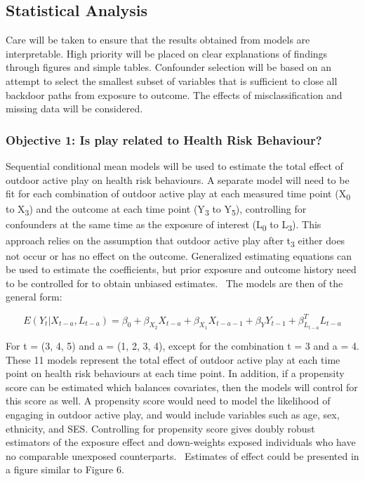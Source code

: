 \documentclass [11pt]{article}
\begin{document}
\subsection{Statistical Analysis} Care will be taken to ensure that the results obtained from models are interpretable. High priority will be placed on clear explanations of findings through figures and simple tables. Confounder selection will be based on an attempt to select the smallest subset of variables that is sufficient to close all backdoor paths from exposure to outcome. The effects of misclassification and missing data will be considered. 

\subsubsection{Objective 1: Is play related to Health Risk Behaviour?}

Sequential conditional mean models \cite{Keogh2018-ra} will be used to estimate the total effect of outdoor active play on health risk behaviours. A separate model will need to be fit for each combination of outdoor active play at each measured time point (X\textsubscript{0} to X\textsubscript{3}) and the outcome at each time point (Y\textsubscript{3} to Y\textsubscript{5}), controlling for confounders at the same time as the exposure of interest (L\textsubscript{0} to L\textsubscript{3}). This approach relies on the assumption that outdoor active play after t\textsubscript{3} either does not occur or has no effect on the outcome. Generalized estimating equations can be used to estimate the coefficients, but prior exposure and outcome history need to be controlled for to obtain unbiased estimates.~\cite{Keogh2018-ra} The models are then of the general form:

\begin{equation}\nonumber
E(Y_t|X_{t-a}, L_{t-a}) = \beta_0  + \beta_{X_2} X_{t-a}  + \beta_{X_1} X_{t-a-1} + \beta_Y Y_{t-1} + \beta_{L_{t-a}}^T L_{t-a}
\end{equation}

For t = (3, 4, 5) and a = (1, 2, 3, 4), except for the combination t = 3 and a = 4. These 11 models represent the total effect of outdoor active play at each time point on health risk behaviours at each time point. In addition, if a propensity score can be estimated which balances covariates, then the models will control for this score as well. A propensity score would need to model the likelihood of engaging in outdoor active play, and would include variables such as age, sex, ethnicity, and SES. Controlling for propensity score gives doubly robust estimators of the exposure effect and down-weights exposed individuals who have no comparable unexposed counterparts.~\cite{Keogh2018-ra} Estimates of effect could be presented in a figure similar to Figure 6. 
\end{document}
